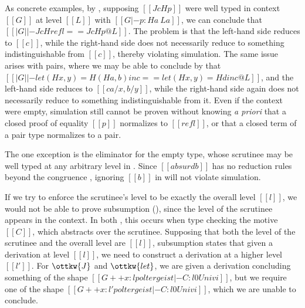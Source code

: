 \documentclass[acmsmall]{acmart}
\makeatletter
\theoremstyle{linked}
\theoremstyle{deflinked}
\theoremstyle{acmdefinition}
\newcommand{\apriori}{\textit{a priori}\@\xspace}
\makeatother
\begin{document}
As concrete examples, by ,
supposing $[[J c H p]]$ were well typed in context $[[G]]$
at level $[[L]]$ with $[[G |- p : H a ~ L a]]$,
we can conclude that $[[| G | |- J c H refl == J c H p @ L]]$.
The problem is that the left-hand side reduces to $[[c]]$,
while the right-hand side does not necessarily reduce to something indistinguishable from $[[c]]$,
thereby violating simulation.
The same issue arises with pairs, where we may be able to conclude by  that
$[[| G | |- let (H x, y) = H (H a, b) in c == let (H x, y) = H d in c @ L]]$,
and the left-hand side reduces to $[[c {a / x, b / y}]]$,
while the right-hand side again does not necessarily reduce to something indistinguishable from it.
Even if the context were empty, simulation still cannot be proven
without knowing \apriori that a closed proof of equality $[[p]]$ normalizes to $[[refl]]$,
or that a closed term of a pair type normalizes to a pair.

The one exception is the eliminator for the empty type,
whose scrutinee may be well typed at any arbitrary level in .
Since $[[absurd b]]$ has no reduction rules beyond the congruence ,
ignoring $[[b]]$ in  will not violate simulation.

If we try to enforce the scrutinee's level
to be exactly the overall level $[[l]]$,
we would not be able to prove subsumption (),
since the level of the scrutinee appears in the context.
In both , this occurs when type checking the motive $[[C]]$,
which abstracts over the scrutinee.
Supposing that both the level of the scrutinee and the overall level are $[[l]]$,
subsumption states that given a derivation at level $[[l]]$,
we need to construct a derivation at a higher level $[[l']]$.
For $\ottkw{J}$ and $\ottkw{let}$,
we are given a derivation concluding something of the shape
$[[G ++ x : l poltergeist |- C : l0 Univ i]]$,
but we require one of the shape
$[[G ++ x : l' poltergeist |- C : l0 Univ i]]$,
which we are unable to conclude.

\end{document}
